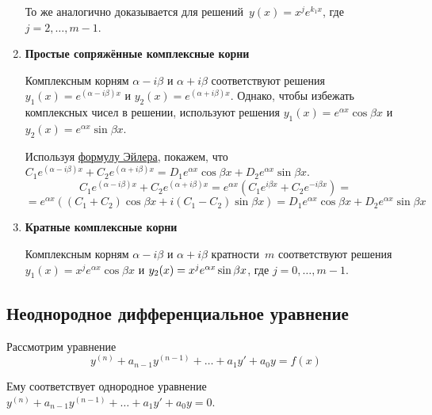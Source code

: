 \begin{enumerate}
	То же аналогично доказывается для решений~$y(x) = x^j e^{k_1 x}$, где $j = 2, \ldots, m - 1$.
	
	\item \textbf{Простые сопряжённые комплексные корни}
	
	Комплексным корням $\alpha - i \beta$ и $\alpha + i \beta$ соответствуют решения~$y_1(x) = e^{(\alpha - i \beta) x}$ и $y_2(x) = e^{(\alpha + i \beta) x}$.
	Однако, чтобы избежать комплексных чисел в решении, используют решения $y_1(x) = e^{\alpha x} \cos \beta x$ и $y_2(x) = e^{\alpha x} \sin \beta x$.
	
	Используя \hyperref[eq:Euler's_formula]{формулу Эйлера}, покажем, что $C_1 e^{(\alpha - i \beta) x} + C_2 e^{(\alpha + i \beta) x} = D_1 e^{\alpha x} \cos \beta x + D_2 e^{\alpha x} \sin \beta x$.
	\begin{equation*}
	C_1 e^{(\alpha - i \beta) x} + C_2 e^{(\alpha + i \beta) x} =
	e^{\alpha x} (C_1 e^{i \beta x} + C_2 e^{-i \beta x}) =
	\end{equation*}
	\begin{equation*}
	= e^{\alpha x} ((C_1 + C_2) \cos \beta x + i(C_1 - C_2) \sin \beta x) =
	D_1 e^{\alpha x} \cos \beta x + D_2 e^{\alpha x} \sin \beta x
	\end{equation*}
	
	\item \textbf{Кратные комплексные корни}
	
	Комплексным корням $\alpha - i \beta$ и $\alpha + i \beta$ кратности~$m$ соответствуют решения $y_1(x) = x^j e^{\alpha x} \cos \beta x$ и $y_2(x) \opbr= x^j e^{\alpha x} \sin \beta x$, где $j = 0, \ldots, m - 1$.
\end{enumerate}

\subsection{Неоднородное дифференциальное уравнение}
Рассмотрим уравнение
\begin{equation}
\label{eq:heterogeneous_differential_equation}
y^{(n)} + a_{n-1} y^{(n-1)} + \ldots + a_1 y' + a_0 y = f(x)
\end{equation}

Ему соответствует однородное уравнение $y^{(n)} + a_{n-1} y^{(n-1)} + \ldots + a_1 y' + a_0 y = 0$.

